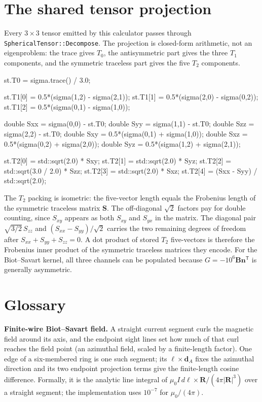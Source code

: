 \documentclass[11pt]{article}
\newcommand{\code}[1]{\texttt{#1}}
\begin{document}
\section{The shared tensor projection}

Every \(3\times3\) tensor emitted by this calculator passes through
\code{SphericalTensor::Decompose}. The projection is closed-form arithmetic,
not an eigenproblem: the trace gives \(T_0\), the antisymmetric part gives the
three \(T_1\) components, and the symmetric traceless part gives the five
\(T_2\) components.

\begin{codebox}
st.T0 = sigma.trace() / 3.0;

st.T1[0] = 0.5*(sigma(1,2) - sigma(2,1));
st.T1[1] = 0.5*(sigma(2,0) - sigma(0,2));
st.T1[2] = 0.5*(sigma(0,1) - sigma(1,0));

double Sxx = sigma(0,0) - st.T0;
double Syy = sigma(1,1) - st.T0;
double Szz = sigma(2,2) - st.T0;
double Sxy = 0.5*(sigma(0,1) + sigma(1,0));
double Sxz = 0.5*(sigma(0,2) + sigma(2,0));
double Syz = 0.5*(sigma(1,2) + sigma(2,1));

st.T2[0] = std::sqrt(2.0) * Sxy;
st.T2[1] = std::sqrt(2.0) * Syz;
st.T2[2] = std::sqrt(3.0 / 2.0) * Szz;
st.T2[3] = std::sqrt(2.0) * Sxz;
st.T2[4] = (Sxx - Syy) / std::sqrt(2.0);
\end{codebox}

The \(T_2\) packing is isometric: the five-vector length equals the Frobenius
length of the symmetric traceless matrix \(\bm S\). The off-diagonal
\(\sqrt2\) factors pay for double counting, since \(S_{xy}\) appears as both
\(S_{xy}\) and \(S_{yx}\) in the matrix. The diagonal pair
\(\sqrt{3/2}\,S_{zz}\) and \((S_{xx}-S_{yy})/\sqrt2\) carries the two remaining
degrees of freedom after \(S_{xx}+S_{yy}+S_{zz}=0\). A dot product of stored
\(T_2\) five-vectors is therefore the Frobenius inner product of the symmetric
traceless matrices they encode. For the Biot--Savart kernel, all three
channels can be populated because \(G=-10^6\bm B\bm n^{\mathsf T}\) is
generally asymmetric.

\section{Glossary}

\textbf{Finite-wire Biot--Savart field.} A straight current segment curls the
magnetic field around its axis, and the endpoint sight lines set how much of
that curl reaches the field point (an azimuthal field, scaled by a
finite-length factor). One edge of a six-membered ring is one
such segment; its \(\bm\ell\times\bm d_A\) fixes the azimuthal direction and its
two endpoint projection terms give the finite-length cosine difference.
Formally, it is the analytic line integral of
\(\mu_0 I\,d\bm\ell\times\bm R/(4\pi|\bm R|^3)\) over a straight segment; the
implementation uses \(10^{-7}\) for \(\mu_0/(4\pi)\).
\end{document}
